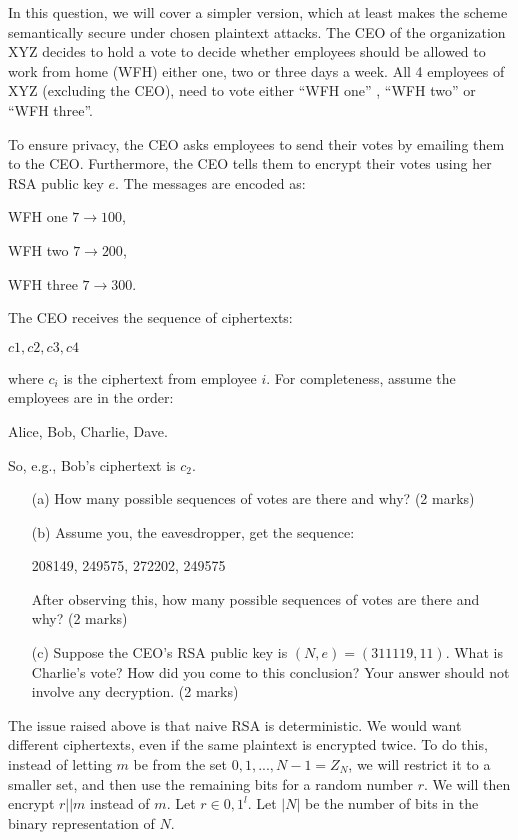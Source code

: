 \documentclass{article}
\begin{document}
In this question, we will cover a simpler version, which at least makes the scheme semantically secure under chosen plaintext attacks. The CEO of the organization XYZ decides to hold a vote to decide whether employees should be allowed to work from home (WFH) either one, two or three days a week. All 4 employees of XYZ (excluding the CEO), need to vote either “WFH one” , “WFH two” or “WFH three”. 

To ensure privacy, the CEO asks employees to send their votes by emailing them to the CEO. Furthermore, the CEO tells them to encrypt their votes using her RSA public key $e$. The messages are encoded as: 
\begin{center}
WFH one $7\rightarrow 100$,

WFH two $7\rightarrow 200$,

WFH three $7\rightarrow 300$.
\end{center}
The CEO receives the sequence of ciphertexts: 
\begin{center}
$c1, c2, c3, c4$
\end{center}
where $c_i$ is the ciphertext from employee $i$. For completeness, assume the employees are in the order: 
\begin{center}
Alice, Bob, Charlie, Dave.
\end{center} So, e.g., Bob’s ciphertext is $c_2$.

\begin{itemize}
    \item[(a)] How many possible sequences of votes are there and why? (2 marks)
    \item[(b)] Assume you, the eavesdropper, get the sequence: 
    \begin{center}
208149, 249575, 272202, 249575
\end{center} After observing this, how many possible sequences of votes are there and why? (2 marks)
    \item[(c)] Suppose the CEO’s RSA public key is $(N, e) = (311119, 11)$. What is Charlie’s vote? How did you come to this conclusion? Your answer should not involve any decryption. (2 marks)
\end{itemize}

The issue raised above is that naive RSA is deterministic. We would want different ciphertexts, even if the same plaintext is encrypted twice. To do this, instead of letting $m$ be from the set ${0, 1, . . . , N − 1} = Z_N$, we will restrict it to a smaller set, and then use the remaining bits for a random number $r$. We will then encrypt $r||m$ instead of $m$. Let $r \in {0,1}^l$. Let $|N|$ be the number of bits in the binary representation of $N$.
\end{document}
